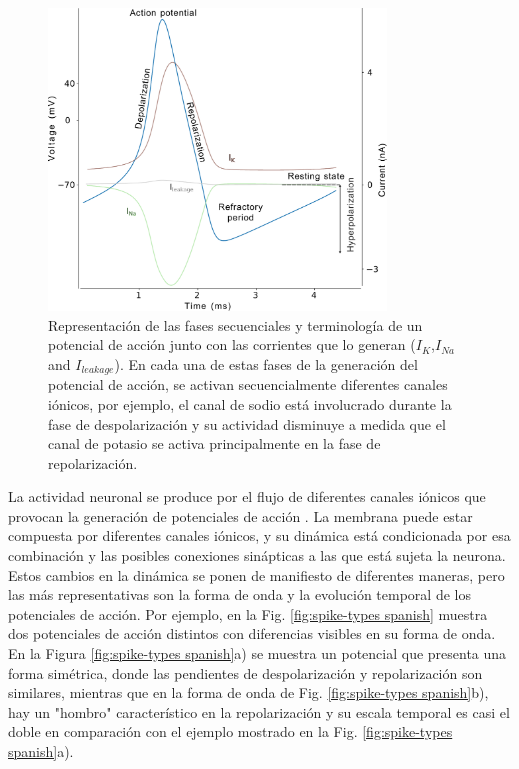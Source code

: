 \begin{figure}[htb!]
	\centering
	\includegraphics[width=0.8\textwidth]{img/intro/action_potential.pdf}
	\caption{Representación de las fases secuenciales y terminología de un potencial de acción junto con las corrientes que lo generan ($I_K$,$I_{Na}$ and $I_{leakage}$). En cada una de estas fases de la generación del potencial de acción, se activan secuencialmente diferentes canales iónicos, por ejemplo, el canal de sodio está involucrado durante la fase de despolarización y su actividad disminuye a medida que el canal de potasio se activa principalmente en la fase de repolarización.}
	\label{fig:action potential spanish}
\end{figure}

La actividad neuronal se produce por el flujo de diferentes canales iónicos que provocan la generación de potenciales de acción \parencite{koch_biophysics_1999}. La membrana puede estar compuesta por diferentes canales iónicos, y su dinámica está condicionada por esa combinación y las posibles conexiones sinápticas a las que está sujeta la neurona. Estos cambios en la dinámica se ponen de manifiesto de diferentes maneras, pero las más representativas son la forma de onda y la evolución temporal de los potenciales de acción. %
Por ejemplo, en la Fig. \ref{fig:spike-types spanish} muestra dos potenciales de acción distintos con diferencias visibles en su forma de onda. En la Figura \ref{fig:spike-types spanish}a) se muestra un potencial que presenta una forma simétrica, donde las pendientes de despolarización y repolarización son similares, mientras que en la forma de onda de Fig. \ref{fig:spike-types spanish}b), hay un "hombro" característico en la repolarización y su escala temporal es casi el doble en comparación con el ejemplo mostrado en la Fig. \ref{fig:spike-types spanish}a).

